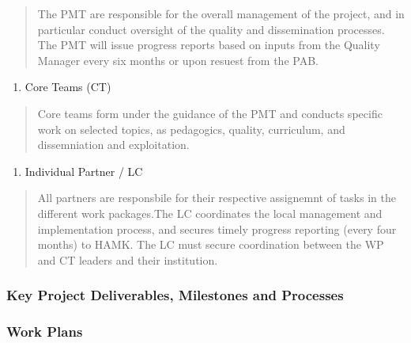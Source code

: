 \documentclass[
  11pt,
]{article}
\providecommand{\tightlist}{%
  \setlength{\itemsep}{0pt}\setlength{\parskip}{0pt}}
\begin{document}
\begin{quote}
The PMT are responsible for the overall management of the project, and
in particular conduct oversight of the quality and dissemination
processes. The PMT will issue progress reports based on inputs from the
Quality Manager every six months or upon resuest from the PAB.
\end{quote}

\begin{enumerate}
\def\labelenumi{\arabic{enumi}.}
\setcounter{enumi}{2}
\tightlist
\item
  Core Teams (CT)
\end{enumerate}

\begin{quote}
Core teams form under the guidance of the PMT and conducts specific work
on selected topics, as pedagogics, quality, curriculum, and
dissemniation and exploitation.
\end{quote}

\begin{enumerate}
\def\labelenumi{\arabic{enumi}.}
\setcounter{enumi}{3}
\tightlist
\item
  Individual Partner / LC
\end{enumerate}

\begin{quote}
All partners are responsbile for their respective assignemnt of tasks in
the different work packages.The LC coordinates the local management and
implementation process, and secures timely progress reporting (every
four months) to HAMK. The LC must secure coordination between the WP and
CT leaders and their institution.
\end{quote}

\hypertarget{key-project-deliverables-milestones-and-processes}{%
\subsubsection{Key Project Deliverables, Milestones and
Processes}\label{key-project-deliverables-milestones-and-processes}}

\hypertarget{work-plans}{%
\subsubsection{Work Plans}\label{work-plans}}
\end{document}
